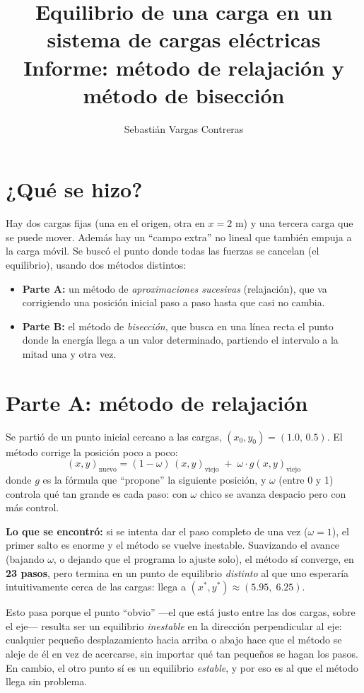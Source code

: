 \documentclass[11pt]{article}
\title{\textbf{Equilibrio de una carga en un sistema de cargas eléctricas}\\[4pt]
\large Informe: método de relajación y método de bisección}
\author{Sebastián Vargas Contreras}
\date{}
\begin{document}
\maketitle
\vspace{-1cm}

\section*{¿Qué se hizo?}

Hay dos cargas fijas (una en el origen, otra en $x=2$ m) y una tercera carga que se puede mover.
Además hay un ``campo extra'' no lineal que también empuja a la carga móvil. Se buscó el punto
donde todas las fuerzas se cancelan (el equilibrio), usando dos métodos distintos:

\begin{itemize}
  \item \textbf{Parte A:} un método de \emph{aproximaciones sucesivas} (relajación), que va
  corrigiendo una posición inicial paso a paso hasta que casi no cambia.
  \item \textbf{Parte B:} el método de \emph{bisección}, que busca en una línea recta el punto
  donde la energía llega a un valor determinado, partiendo el intervalo a la mitad una y otra vez.
\end{itemize}

\section*{Parte A: método de relajación}

Se partió de un punto inicial cercano a las cargas, $(x_0,y_0) = (1.0,\,0.5)$. El método corrige
la posición poco a poco:
\[
(x,y)_{\text{nuevo}} = (1-\omega)\,(x,y)_{\text{viejo}} \;+\; \omega \cdot g(x,y)_{\text{viejo}}
\]
donde $g$ es la fórmula que ``propone'' la siguiente posición, y $\omega$ (entre 0 y 1) controla
qué tan grande es cada paso: con $\omega$ chico se avanza despacio pero con más control.

\textbf{Lo que se encontró:} si se intenta dar el paso completo de una vez ($\omega=1$), el primer
salto es enorme y el método se vuelve inestable. Suavizando el avance (bajando $\omega$, o
dejando que el programa lo ajuste solo), el método sí converge, en \textbf{23 pasos}, pero termina
en un punto de equilibrio \emph{distinto} al que uno esperaría intuitivamente cerca de las cargas:
llega a $(x^*,y^*)\approx(5.95,\;6.25)$.

Esto pasa porque el punto ``obvio'' —el que está justo entre las dos cargas, sobre el eje— resulta
ser un equilibrio \emph{inestable} en la dirección perpendicular al eje: cualquier pequeño
desplazamiento hacia arriba o abajo hace que el método se aleje de él en vez de acercarse, sin
importar qué tan pequeños se hagan los pasos. En cambio, el otro punto sí es un equilibrio
\emph{estable}, y por eso es al que el método llega sin problema.
\end{document}
